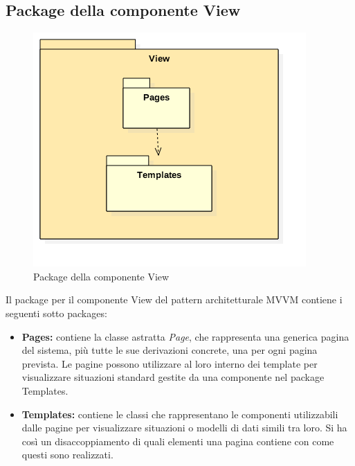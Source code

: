 \subsection{Package della componente View}
	\begin{figure}[h!]
	\begin{center}
		\includegraphics[scale=0.6]{../../images/ViewPackage.png}
		\caption{Package della componente View}
	\end{center}
	\end{figure}
	Il package per il componente View del pattern architetturale MVVM contiene i seguenti sotto packages:
	\begin{itemize}
		\item\textbf{Pages:} contiene la classe astratta \textit{Page}, che rappresenta una generica pagina del sistema, più tutte le sue derivazioni concrete, una per ogni pagina prevista. Le pagine possono utilizzare al loro interno dei template per visualizzare situazioni standard gestite da una componente nel package Templates.
		\item\textbf{Templates:} contiene le classi che rappresentano le componenti utilizzabili dalle pagine per visualizzare situazioni o modelli di dati simili tra loro. Si ha così un disaccoppiamento di quali elementi una pagina contiene con come questi sono realizzati.\\
\\
\end{itemize}	